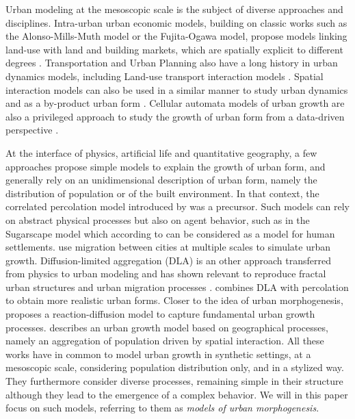 \documentclass[10pt]{article}
\begin{document}

Urban modeling at the mesoscopic scale is the subject of diverse approaches and disciplines. Intra-urban urban economic models, building on classic works such as the Alonso-Mills-Muth model or the Fujita-Ogawa model, propose models linking land-use with land and building markets, which are spatially explicit to different degrees \cite{viguie2012trade}. Transportation and Urban Planning also have a long history in urban dynamics models, including Land-use transport interaction models \cite{wegener2004land}. Spatial interaction models can also be used in a similar manner to study urban dynamics and as a by-product urban form \cite{milton2019accelerating}. Cellular automata models of urban growth are also a privileged approach to study the growth of urban form from a data-driven perspective \cite{batty1997cellular}.

At the interface of physics, artificial life and quantitative geography, a few approaches propose simple models to explain the growth of urban form, and generally rely on an unidimensional description of urban form, namely the distribution of population or of the built environment. In that context, the correlated percolation model introduced by \cite{makse1998modeling} was a precursor. Such models can rely on abstract physical processes but also on agent behavior, such as in the Sugarscape model which according to \cite{batty2007cities} can be considered as a model for human settlements. \cite{murcio2015urban} use migration between cities at multiple scales to simulate urban growth. Diffusion-limited aggregation (DLA) is an other approach transferred from physics to urban modeling \cite{batty1989urban} and has shown relevant to reproduce fractal urban structures and urban migration processes \cite{murcio2009colored}. \cite{murcio2013second} combines DLA with percolation to obtain more realistic urban forms. Closer to the idea of urban morphogenesis, \cite{10.1371/journal.pone.0203516} proposes a reaction-diffusion model to capture fundamental urban growth processes. \cite{li2019singularity} describes an urban growth model based on geographical processes, namely an aggregation of population driven by spatial interaction. All these works have in common to model urban growth in synthetic settings, at a mesoscopic scale, considering population distribution only, and in a stylized way. They furthermore consider diverse processes, remaining simple in their structure although they lead to the emergence of a complex behavior. We will in this paper focus on such models, referring to them as \emph{models of urban morphogenesis}.
\end{document}
